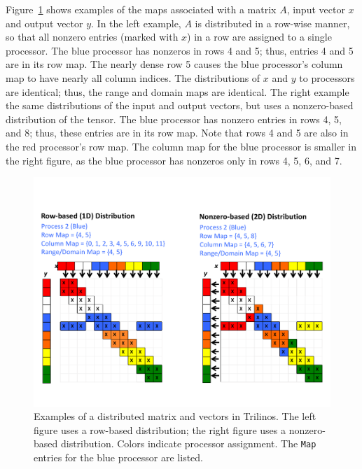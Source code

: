 Figure~\ref{fig:trilinosmap} shows examples of the maps associated with a 
matrix $A$, input vector $x$ and output vector $y$.  In the left example, 
$A$ is distributed in a 
row-wise manner, so that all nonzero entries (marked with $x$) in a row
are assigned to a single processor.  The blue processor has nonzeros in
rows 4 and 5; thus, entries 4 and 5 are in its row map.  The nearly dense
row 5 causes the blue processor's column map to have nearly all column 
indices.  The distributions of $x$ and $y$ to processors are identical;
thus, the range and domain maps are identical.   The right example the same
distributions of the input and output vectors, but uses a 
nonzero-based distribution of the tensor.  The blue
processor has nonzero entries in rows 4, 5, and 8; thus, these entries are 
in its row map.  Note that rows 4 and 5 are also in the red processor's
row map.  The column map for the blue processor is smaller in the right 
figure, as the blue processor has nonzeros only in rows 4, 5, 6, and 7.

\begin{figure}[ht]
   \centering
   \includegraphics[keepaspectratio=true, width=6in]{figs/trilinosmaps}
   \caption[Examples of a distributed matrix and vectors in Trilinos]{Examples of a distributed matrix and vectors in Trilinos.  The left figure uses a row-based distribution; the right figure uses a nonzero-based distribution.  Colors indicate processor assignment.  The {\tt Map} entries for the blue processor are listed.}
   \label{fig:trilinosmap}
\end{figure}


